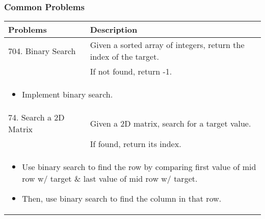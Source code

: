 \subsubsection{Common Problems}
\begin{summary}
    \begin{center}
        \begin{tabular}{ll}
            \toprule
            \textbf{Problems} & \textbf{Description} \\
            \midrule
            704. Binary Search & Given a sorted array of integers, return the index of the target. \\
            & If not found, return -1. \\
            \multicolumn{2}{p{\linewidth}}{
                \begin{itemize}
                    \item Implement binary search.
                \end{itemize}
            } \\
            \midrule
            74. Search a 2D Matrix & Given a 2D matrix, search for a target value. \\
            & If found, return its index. \\
            \multicolumn{2}{p{\linewidth}}{
                \begin{itemize}
                    \item Use binary search to find the row by comparing first value of mid row w/ target \& last value of mid row w/ target.
                    \item Then, use binary search to find the column in that row.
                \end{itemize}
            } \\
            \bottomrule
        \end{tabular}
    \end{center}
\end{summary}
